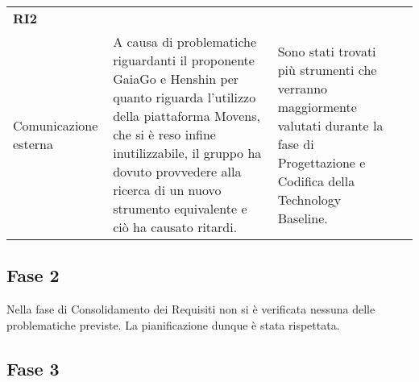 \begin{longtable}{ 
		>{\centering}p{} 
		>{\raggedright}p{}
		>{\raggedright}p{} 
		>{\centering}p{}
	}
	\textbf{RI2} \\ Comunicazione esterna & 
	A causa di problematiche riguardanti il proponente GaiaGo e Henshin per quanto riguarda l'utilizzo della piattaforma Movens, che si è reso infine inutilizzabile, il gruppo ha dovuto provvedere alla ricerca di un nuovo strumento equivalente e ciò ha causato ritardi. &
	Sono stati trovati più strumenti che verranno maggiormente valutati durante la fase di Progettazione e Codifica della Technology Baseline.
	\tabularnewline
	
		\end{longtable}
\renewcommand{\arraystretch}{1}

\subsection{Fase 2}
Nella fase di Consolidamento dei Requisiti non si è verificata nessuna delle problematiche previste. La pianificazione dunque è stata rispettata.

\subsection{Fase 3}

